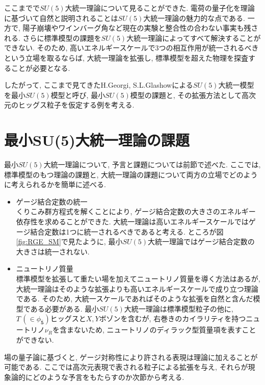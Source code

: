%
%
ここまでで$SU(5)$大統一理論について見ることができた.
電荷の量子化を理論に基づいて自然と説明されることは$SU(5)$大統一理論の魅力的な点である.
一方で, 陽子崩壊やワインバーグ角など現在の実験と整合性の合わない事実も残される.
さらに標準模型の課題を$SU(5)$大統一理論によってすべて解決することができない.
そのため, 高いエネルギースケールで3つの相互作用が統一されるべきという立場を取るならば, 大統一理論を拡張し, 標準模型を超えた物理を探査することが必要となる.

したがって, ここまで見てきたH.Georgi, S.L.Glashowによる$SU(5)$大統一模型を最小$SU(5)$模型と呼び, 最小$SU(5)$模型の課題と, その拡張方法として高次元のヒッグス粒子を仮定する例を考える.
\section{最小SU(5)大統一理論の課題}
最小$SU(5)$大統一理論について, 予言と課題については前節で述べた.
ここでは, 標準模型のもつ理論の課題と, 大統一理論の課題について両方の立場でどのように考えられるかを簡単に述べる.
\begin{itemize}
  \item ゲージ結合定数の統一\\
        くりこみ群方程式を解くことにより, ゲージ結合定数の大きさのエネルギー依存性を求めることができた.
        大統一理論は高いエネルギースケールではゲージ結合定数は1つに統一されるべきであると考える.
        ところが図\ref{fig:RGE_SM}で見たように, 最小$SU(5)$大統一理論ではゲージ結合定数の大きさは統一されない.
  \item ニュートリノ質量\\
        標準模型を拡張して重たい場を加えてニュートリノ質量を導く方法はあるが, 大統一理論はそのような拡張よりも高いエネルギースケールで成り立つ理論である.
        そのため, 大統一スケールであればそのような拡張を自然と含んだ模型である必要がある.
        最小$SU(5)$大統一理論は標準模型粒子の他に, $T \,(\in \phi_{\bar{\bm{5}}})$ヒッグスと$X,Y$ボゾンを含むが, 右巻きのカイラリティを持つニュートリノ$\nu_R$を含まないため, ニュートリノのディラック型質量項を表すことができない. 
\end{itemize}
場の量子論に基づくと, ゲージ対称性により許される表現は理論に加えることが可能である.
ここでは高次元表現で表される粒子による拡張を与え, それらが現象論的にどのような予言をもたらすのか次節から考える.
